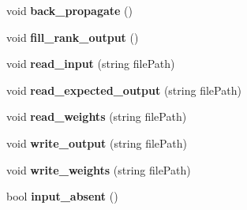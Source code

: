 \begin{DoxyCompactItemize}
\item 
\hypertarget{classNeural__Network_a5a0cac77d13e3ffdd3088cb684d39859}{void {\bfseries back\-\_\-propagate} ()}\label{classNeural__Network_a5a0cac77d13e3ffdd3088cb684d39859}

\item 
\hypertarget{classNeural__Network_a968b3636a13002a3454c8c2eacbf7229}{void {\bfseries fill\-\_\-rank\-\_\-output} ()}\label{classNeural__Network_a968b3636a13002a3454c8c2eacbf7229}

\item 
\hypertarget{classNeural__Network_a9d07c8020971a4da088839084e1321cf}{void {\bfseries read\-\_\-input} (string file\-Path)}\label{classNeural__Network_a9d07c8020971a4da088839084e1321cf}

\item 
\hypertarget{classNeural__Network_a3cac10960b86787c62f2af28adf8f263}{void {\bfseries read\-\_\-expected\-\_\-output} (string file\-Path)}\label{classNeural__Network_a3cac10960b86787c62f2af28adf8f263}

\item 
\hypertarget{classNeural__Network_a80f1c88f48a7d6f10bfd4ac808e11217}{void {\bfseries read\-\_\-weights} (string file\-Path)}\label{classNeural__Network_a80f1c88f48a7d6f10bfd4ac808e11217}

\item 
\hypertarget{classNeural__Network_a9d4c8fcf362aaf4507644d711e4c254d}{void {\bfseries write\-\_\-output} (string file\-Path)}\label{classNeural__Network_a9d4c8fcf362aaf4507644d711e4c254d}

\item 
\hypertarget{classNeural__Network_aec4b99de94c88ea069c550f6373fdc2b}{void {\bfseries write\-\_\-weights} (string file\-Path)}\label{classNeural__Network_aec4b99de94c88ea069c550f6373fdc2b}

\item 
\hypertarget{classNeural__Network_a3d073d4957def9b6a4498448260fedeb}{bool {\bfseries input\-\_\-absent} ()}\label{classNeural__Network_a3d073d4957def9b6a4498448260fedeb}

\end{DoxyCompactItemize}
